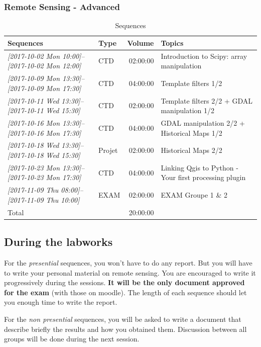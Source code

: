 \documentclass[a4paper,11pt,DIV=18]{scrartcl}
\begin{document}
\subsubsection{Remote Sensing - Advanced}
\label{sec:orgccb5a28}
\begin{table}[htb]\footnotesize
\caption{Sequences}
\centering
\begin{tabular}{llrl}
\toprule
Sequences & Type & Volume & Topics\\
\midrule
\textit{[2017-10-02 Mon 10:00]--[2017-10-02 Mon 12:00]} & CTD & 02:00:00 & Introduction to Scipy: array manipulation\\
\textit{[2017-10-09 Mon 13:30]--[2017-10-09 Mon 17:30]} & CTD & 04:00:00 & Template filters  1/2\\
\textit{[2017-10-11 Wed 13:30]--[2017-10-11 Wed 15:30]} & CTD & 02:00:00 & Template filters 2/2 + GDAL manipulation 1/2\\
\textit{[2017-10-16 Mon 13:30]--[2017-10-16 Mon 17:30]} & CTD & 04:00:00 & GDAL manipulation 2/2 + Historical Maps 1/2\\
\textit{[2017-10-18 Wed 13:30]--[2017-10-18 Wed 15:30]} & Projet & 02:00:00 & Historical Maps 2/2\\
\textit{[2017-10-23 Mon 13:30]--[2017-10-23 Mon 17:30]} & CTD & 04:00:00 & Linking Qgis to Python - Your first processing plugin\\
\textit{[2017-11-09 Thu 08:00]--[2017-11-09 Thu 10:00]} & EXAM & 02:00:00 & EXAM Groupe 1 \& 2\\
\midrule
Total &  & 20:00:00 & \\
\bottomrule
\end{tabular}
\end{table}



\subsection{During the labworks}
\label{sec:org1870b57}
For the \emph{presential} sequences, you won't have to do any report. But you
will have to  write your personal material on remote  sensing. You are
encouraged to write it progressively  during the sessions.  \textbf{It will be
the only  document approved for the  exam} (with those on  moodle). The
length  of each  sequence  should let  you enough  time  to write  the
report.

For  the \emph{non  presential}  sequences,  you will  be  asked  to write  a
document  that  describe briefly  the  results  and how  you  obtained
them.  Discussion between  all groups  will  be done  during the  next
session.
\end{document}
